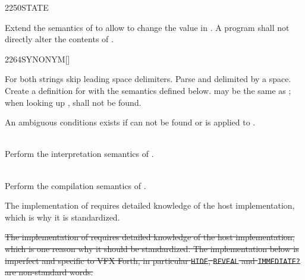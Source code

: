 \vspace*{-2.5ex}
\begin{worddef}{2250}{STATE}
\item {}

	Extend the semantics of  to allow
	 to change the value in . A program
	shall not directly alter the contents of .

	\walso{core:[}
	\walso{core:]}
\end{worddef}

\vspace*{-2.5ex}
\begin{worddef}{2264}{SYNONYM}[]%
\item {}

	For both strings skip leading space delimiters.  Parse 
	and  delimited by a space.  Create a definition for
	 with the semantics defined below.
	 may be the same as ;
	when looking up ,  shall not be found.

	An ambiguous conditions exists if  can not be found or
	 is applied to .

\item[\param{newname} interpretation]
	 \\
	Perform the interpretation semantics of .

\item[\param{newname} compilation]
	 \\
	Perform the compilation semantics of .


	\begin{rationale}
		\cbstart{}%
		The implementation of  requires detailed knowledge of
		the host implementation, which is why it is standardized.
		\cbend
	\end{rationale}

	\begin{implement} %
		\cbstart{}%
		\dffamily
		\sout{The implementation of  requires detailed knowledge
		of the host implementation, which is one reason why it should be
		standardized.  The implementation below is imperfect and specific
		to VFX Forth, in particular \texttt{HIDE}, \texttt{REVEAL} and
		\texttt{IMMEDIATE?} are non-standard words.}


\end{implement}
\end{worddef}
